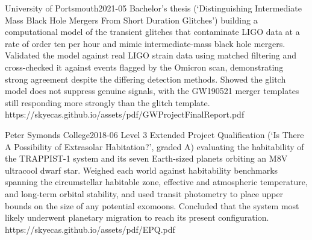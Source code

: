 {University of Portsmouth}{2021-05}
{Bachelor's thesis (`Distinguishing Intermediate Mass Black Hole Mergers From Short Duration Glitches') building a computational model of the transient glitches that contaminate LIGO data at a rate of order ten per hour and mimic intermediate-mass black hole mergers. Validated the model against real LIGO strain data using matched filtering and cross-checked it against events flagged by the Omicron scan, demonstrating strong agreement despite the differing detection methods. Showed the glitch model does not suppress genuine signals, with the GW190521 merger templates still responding more strongly than the glitch template.}
{https://skyecas.github.io/assets/pdf/GWProjectFinalReport.pdf}

{Peter Symonds College}{2018-06}
{Level 3 Extended Project Qualification (`Is There A Possibility of Extrasolar Habitation?', graded A) evaluating the habitability of the TRAPPIST-1 system and its seven Earth-sized planets orbiting an M8V ultracool dwarf star. Weighed each world against habitability benchmarks spanning the circumstellar habitable zone, effective and atmospheric temperature, and long-term orbital stability, and used transit photometry to place upper bounds on the size of any potential exomoons. Concluded that the system most likely underwent planetary migration to reach its present configuration.}
{https://skyecas.github.io/assets/pdf/EPQ.pdf}
\fi

